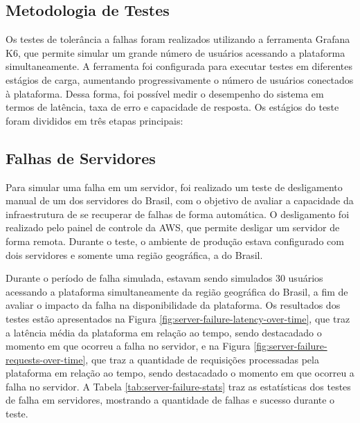 \subsection{Metodologia de Testes}

Os testes de tolerância a falhas foram realizados utilizando a ferramenta Grafana K6, que permite simular um grande número de usuários acessando a plataforma simultaneamente. A ferramenta foi configurada para executar testes em diferentes estágios de carga, aumentando progressivamente o número de usuários conectados à plataforma. Dessa forma, foi possível medir o desempenho do sistema em termos de latência, taxa de erro e capacidade de resposta. Os estágios do teste foram divididos em três etapas principais:

\subsection{Falhas de Servidores}

Para simular uma falha em um servidor, foi realizado um teste de desligamento manual de um dos servidores do Brasil, com o objetivo de avaliar a capacidade da infraestrutura de se recuperar de falhas de forma automática. O desligamento foi realizado pelo painel de controle da AWS, que permite desligar um servidor de forma remota. Durante o teste, o ambiente de produção estava configurado com dois servidores e somente uma região geográfica, a do Brasil.

Durante o período de falha simulada, estavam sendo simulados 30 usuários acessando a plataforma simultaneamente da região geográfica do Brasil, a fim de avaliar o impacto da falha na disponibilidade da plataforma. Os resultados dos testes estão apresentados na Figura \ref{fig:server-failure-latency-over-time}, que traz a latência média da plataforma em relação ao tempo, sendo destacadado o momento em que ocorreu a falha no servidor, e na Figura \ref{fig:server-failure-requests-over-time}, que traz a quantidade de requisições processadas pela plataforma em relação ao tempo, sendo destacadado o momento em que ocorreu a falha no servidor. A Tabela \ref{tab:server-failure-stats} traz as estatísticas dos testes de falha em servidores, mostrando a quantidade de falhas e sucesso durante o teste.



